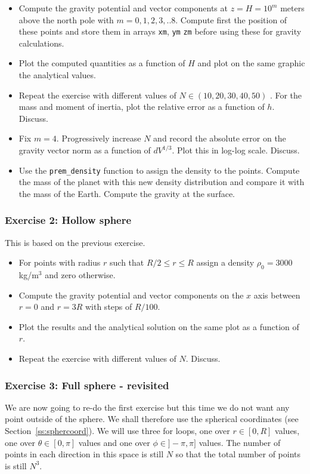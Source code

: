 \begin{itemize}
\item Compute the gravity potential and vector components at $z=H=10^m$ meters above the north pole 
with $m=0,1,2,3,..8$. Compute first the position of these points and store them 
in arrays {\tt xm}, {\tt ym} {\tt zm} before using these for gravity calculations. 
\item Plot the computed quantities as a function of $H$ and plot on the same graphic the analytical values. 
\item Repeat the exercise with different values of $N\in(10,20,30,40,50)$ .
For the mass and moment of inertia, plot the relative error as a function of $h$.
Discuss.
\item Fix $m=4$. Progressively increase $N$ and record the absolute error on the gravity vector norm 
as a function of $dV^{1/3}$. Plot this in log-log scale. Discuss.
\item Use the {\tt prem\_density} function to assign the density to the points. Compute the mass of the planet with this new density distribution and compare it with the mass of the Earth. Compute the gravity at the surface.
\end{itemize}

\subsubsection*{Exercise 2: Hollow sphere}

This is based on the previous exercise. 
\begin{itemize}
\item For points with radius $r$ such that $R/2 \le r \le R$ assign a density $\rho_0=3000$kg/m$^3$ 
and zero otherwise.
\item Compute the gravity potential and vector components on the $x$ axis between $r=0$ and $r=3R$ 
with steps of $R/100$.
\item Plot the results and the analytical solution on the same plot as a function of $r$.
\item Repeat the exercise with different values of $N$. Discuss.
\end{itemize}

\subsubsection*{Exercise 3: Full sphere - revisited}

We are now going to re-do the first exercise but this time we do not want any point outside of the sphere. 
We shall therefore use the spherical coordinates (see Section~\ref{ss:sphercoord}).
We will use three for loops, one over $r\in[0,R]$ values, 
one over $\theta\in[0,\pi]$ values and one over $\phi\in]-\pi,\pi]$ values. The number 
of points in each direction in this space is still $N$ so that the total number of points is
still $N^3$.


